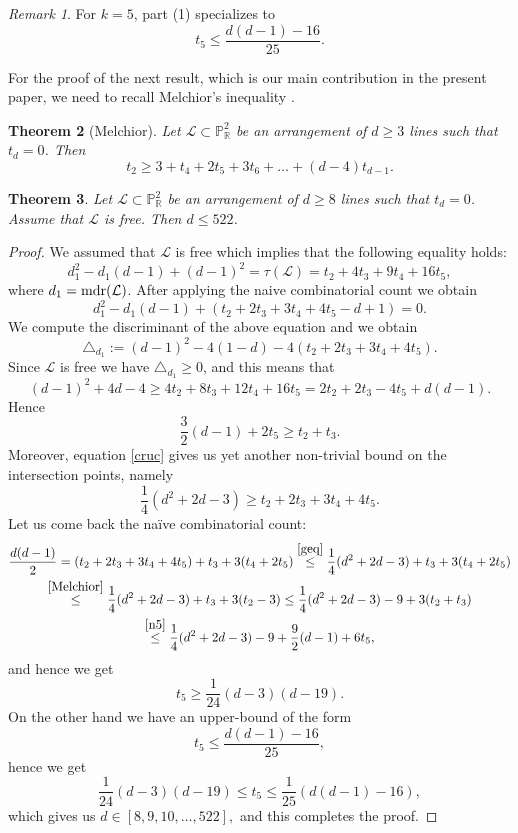 \documentclass[11pt]{article}
\theoremstyle{plain}
\newtheorem{theorem}{Theorem}[section]
\theoremstyle{definition}
\theoremstyle{remark}
\newtheorem{remark}[theorem]{Remark}
\begin{document}
\begin{remark}
For $k=5$, part (1) specializes to
\[
t_5 \le \frac{d(d-1)-16}{25}.
\]
\end{remark}
For the proof of the next result, which is our main contribution in the present paper, we need to recall Melchior's inequality \cite{Melchior}.
\begin{theorem}[Melchior]
Let $\mathcal{L} \subset \mathbb{P}^{2}_{\mathbb{R}}$ be an arrangement of $d\geq 3$ lines such that $t_{d}=0$. Then
\begin{equation}
\label{Melchior}
t_{2} \geq 3 + t_{4} + 2t_{5} + 3t_{6} + \ldots + (d-4)t_{d-1}.  
\end{equation}
\end{theorem}
\begin{theorem}
\label{main}
Let $\mathcal{L} \subset \mathbb{P}^{2}_{\mathbb{R}}$ be an arrangement of $d\geq 8$ lines such that $t_{d}=0$. Assume that $\mathcal{L}$ is free. Then $d\leq 522$.
\end{theorem}
\begin{proof}
We assumed that $\mathcal{L}$ is free which implies that the following equality holds:
\[ d_{1}^{2} - d_{1}(d-1) +(d-1)^2 = \tau(\mathcal{L}) = t_{2} + 4t_{3} + 9t_{4}+16t_{5},\]
where $d_{1}={\rm mdr}(\mathcal{L})$. After applying the naive combinatorial count we obtain
\[d_{1}^{2}-d_{1}(d-1) + (t_{2}+2t_{3}+3t_{4}+4t_{5}-d+1) = 0.\]
We compute the discriminant of the above equation and we obtain
\begin{equation}
\label{cruc}
\triangle_{d_{1}} := (d-1)^2 - 4(1-d) -4(t_{2}+2t_{3}+3t_{4}+4t_{5}).
\end{equation}
Since $\mathcal{L}$ is free we have $\triangle_{d_{1}}\geq 0$, and this means that
\[(d-1)^2+4d-4 \geq 4t_{2} + 8t_{3} + 12t_{4} + 16t_{5} = 2t_{2}+2t_{3}-4t_{5}+d(d-1).\]
Hence
\begin{equation}
\label{n5}
\frac{3}{2}(d-1) + 2t_{5} \geq t_{2}+t_{3}.
\end{equation}
Moreover, equation \eqref{cruc} gives us yet another non-trivial bound on the intersection points, namely
\begin{equation}
\label{geq}
\frac{1}{4}(d^{2}+2d-3) \geq t_{2}+2t_{3}+3t_{4}+4t_{5}.
\end{equation}
Let us come back the na\"ive combinatorial count:
\begin{multline*}
\frac{d(d-1)}{2} = (t_{2} + 2t_{3} + 3t_{4}+4t_{5}) +t_{3} + 3(t_{4} + 2t_{5}) \stackrel{\eqref{geq}}{\leq} \frac{1}{4}(d^2+2d-3) + t_{3} + 3(t_{4}+2t_{5}) \\ \stackrel{\eqref{Melchior}}{\leq} \frac{1}{4}(d^2+2d-3)+t_{3} + 3(t_{2}-3) \leq \frac{1}{4}(d^{2}+2d-3)-9 + 3(t_{2}+t_{3}) \\
\stackrel{\eqref{n5}}{\leq}  \frac{1}{4}(d^{2}+2d-3)-9 + \frac{9}{2}(d-1)+6t_{5},
\end{multline*}
and hence we get 
$$t_{5} \geq \frac{1}{24}(d-3)(d-19).$$
On the other hand we have an upper-bound of the form
$$t_{5} \leq \frac{d(d-1)-16}{25},$$
hence we get
\[\frac{1}{24}(d-3)(d-19) \leq t_{5} \leq \frac{1}{25}(d(d-1)-16),\]
which gives us $d \in [8,9,10, \ldots , 522],$ and this completes the proof.
\end{proof}
\end{document}

